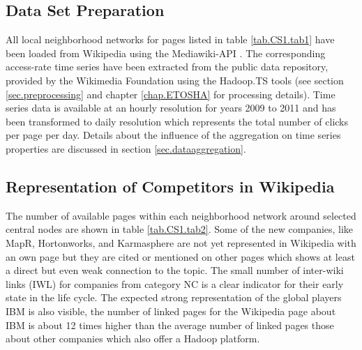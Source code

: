 \documentclass[a4paper,10pt]{scrbook}
\begin{document}
\label{ext.tab.CS1.tab1} 


\subsection{Data Set Preparation}
All local neighborhood networks for pages listed in table \ref{tab.CS1.tab1} have been loaded from Wikipedia using the Mediawiki-API \cite{API.mediawiki}. The corresponding access-rate time series have been extracted from the public data repository, provided by the Wikimedia Foundation using the Hadoop.TS \cite{Hadoop.TS} tools (see section \ref{sec.preprocessing} and chapter \ref{chap.ETOSHA} for processing details). Time series data is available at an hourly resolution for years 2009 to 2011 and has been transformed to daily resolution which represents the total number of clicks per page per day. Details about the influence of the aggregation on time series properties are discussed in section \ref{sec.dataaggregation}.

\subsection{Representation of Competitors in Wikipedia}
The number of available pages within each neighborhood network around selected central nodes are shown in table \ref{tab.CS1.tab2}. Some of the new companies, like MapR, Hortonworks, and Karmasphere are not yet represented in Wikipedia with an own page but they are cited or mentioned on other pages which shows at least a direct but even weak connection to the topic. 
The small number of inter-wiki links (IWL) for companies from category NC is a clear indicator for their early state in the life cycle. The expected strong representation of the global players IBM is also visible, the number of linked pages for the Wikipedia page about IBM is about 12 times higher than the average number of linked pages those about other companies which also offer a Hadoop platform.
  
  
\label{ext.table.RepresentationOfCompetitors} 

\end{document}
